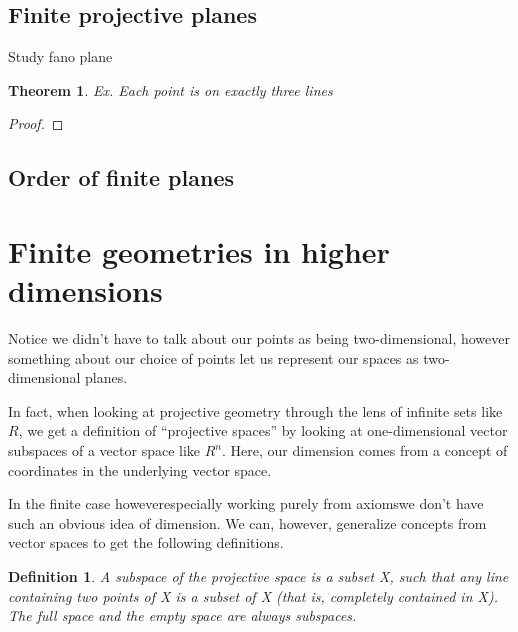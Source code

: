 \documentclass[12pt]{article}
\newtheorem{theorem}{Theorem}
\newtheorem{definition}{Definition}
\begin{document}
    \subsection{Finite projective planes}

    Study fano plane

    \begin{theorem}
        Ex. Each point is on exactly three lines
    \end{theorem}

    \begin{proof}

    \end{proof}

    \subsection{Order of finite planes}


    \section{Finite geometries in higher dimensions}


    Notice we didn't have to talk about our points as being two-dimensional,
    however something about our choice of points let us represent our spaces as two-dimensional planes.

    In fact, when looking at projective geometry through the lens of infinite sets like $R$,
    we get a definition of \enquote{projective spaces} by looking at one-dimensional vector subspaces of a vector space like $R^n$.\cite{weisstein_projective_nodate}
    Here, our dimension comes from a concept of coordinates in the underlying vector space.


    In the finite case however\textemdash especially working purely from axioms\textemdash we don't have such an obvious idea of dimension.
    We can, however, generalize concepts from vector spaces to get the following definitions.\cite{noauthor_projective_2024,beutelspacher_projective_2000}

    \begin{definition}
        A subspace of the projective space is a subset X, such that any line containing two points of X is a subset of X (that is, completely contained in X). The full space and the empty space are always subspaces.
    \end{definition}
\end{document}
